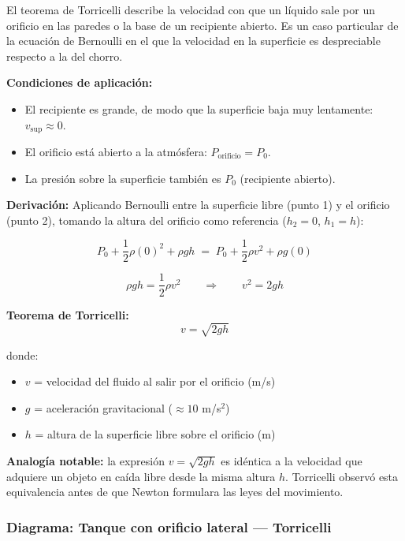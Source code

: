\begin{seccion}
El teorema de Torricelli describe la velocidad con que un líquido sale por un orificio en las paredes o la base de un recipiente abierto. Es un caso particular de la ecuación de Bernoulli en el que la velocidad en la superficie es despreciable respecto a la del chorro.

\textbf{Condiciones de aplicación:}
\begin{itemize}
    \item El recipiente es grande, de modo que la superficie baja muy lentamente: $v_{\text{sup}} \approx 0$.
    \item El orificio está abierto a la atmósfera: $P_{\text{orificio}} = P_0$.
    \item La presión sobre la superficie también es $P_0$ (recipiente abierto).
\end{itemize}

\textbf{Derivación:} Aplicando Bernoulli entre la superficie libre (punto 1) y el orificio (punto 2), tomando la altura del orificio como referencia ($h_2 = 0$, $h_1 = h$):

$$P_0 + \frac{1}{2}\rho (0)^2 + \rho g h \;=\; P_0 + \frac{1}{2}\rho v^2 + \rho g (0)$$

$$\rho g h = \frac{1}{2}\rho v^2 \qquad \Longrightarrow \qquad v^2 = 2gh$$

\begin{ecuacion}
\textbf{Teorema de Torricelli:}
$$v = \sqrt{2gh}$$

donde:
\begin{itemize}
    \item $v$ = velocidad del fluido al salir por el orificio (m/s)
    \item $g$ = aceleración gravitacional ($\approx 10$ m/s$^2$)
    \item $h$ = altura de la superficie libre sobre el orificio (m)
\end{itemize}
\end{ecuacion}

\begin{nota}
\textbf{Analogía notable:} la expresión $v = \sqrt{2gh}$ es idéntica a la velocidad que adquiere un objeto en caída libre desde la misma altura $h$. Torricelli observó esta equivalencia antes de que Newton formulara las leyes del movimiento.
\end{nota}
\end{seccion}

\subsubsection{Diagrama: Tanque con orificio lateral — Torricelli}

